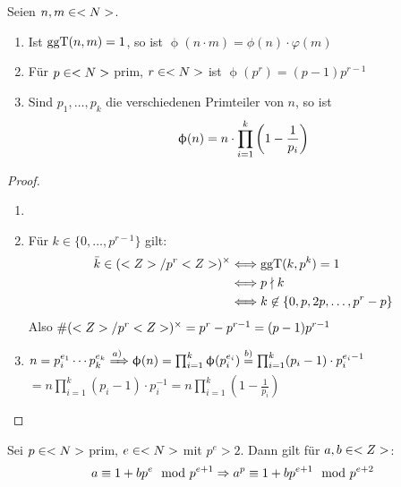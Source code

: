 \begin{proposition}
	Seien $n,m \in <N>$.
	\begin{enumerate}
		\item Ist $\operatorname{ggT}(n,m) = 1$, so ist $\upphi(n\cdot m) = \phi(n)\cdot \varphi(m)$
		\item Für $p \in <N>$ prim, $r \in <N>$ ist $\upphi(p^r) = (p-1)p^{r-1}$
		\item Sind $p_1,\dots, p_k$ die verschiedenen Primteiler von $n$, so ist
		\begin{align}
		\upphi(n) = n \cdot \prod_{i=1}^{k}\left( 1- \frac{1}{p_i}\right) \notag
		\end{align}
	\end{enumerate}
\end{proposition}

\begin{proof}
	\begin{enumerate}
		\item {}
		\item Für $k \in \{0,\dots,p^{r-1}\}$ gilt:
		\begin{align}
			\bar{k} \in (<Z> / p^r <Z>)^{\times} &\Longleftrightarrow \operatorname{ggT}(k, p^k) = 1\notag \\
			&\Longleftrightarrow p \nmid k\notag \\
			&\Longleftrightarrow k \not \in \{0, p, 2p, \dots, p^r-p\}\notag
		\end{align}
		Also $\#(<Z> /p^r <Z>)^{\times} = p^r - p^{r-1} = (p-1)p^{r-1}$
		\item $n = p_i^{e_1}\cdots p_k^{e_k} \xRightarrow{a)} \upphi(n) = \prod_{i = 1}^{k} \upphi(p_i^{e_i}) \overset{b)}{=} \prod_{i=1}^{k} (p_i - 1)\cdot p_i^{e_i - 1}$\\
		$= n \prod_{i=1}^{k}(p_i - 1)\cdot p_i^{-1} = n \prod_{i=1}^{k}(1-\frac{1}{p_i})$
	\end{enumerate}
\end{proof}

\begin{lemma}
	Sei $p \in <N>$ prim, $e \in <N>$ mit $p^{e} > 2$. Dann gilt für $a,b \in <Z>$:
	\begin{align}
		a \equiv 1 + bp^{e} \mod p^{e+1} \Rightarrow a^p \equiv 1 + bp^{e+1} \mod p^{e+2} \notag
	\end{align}
\end{lemma}

